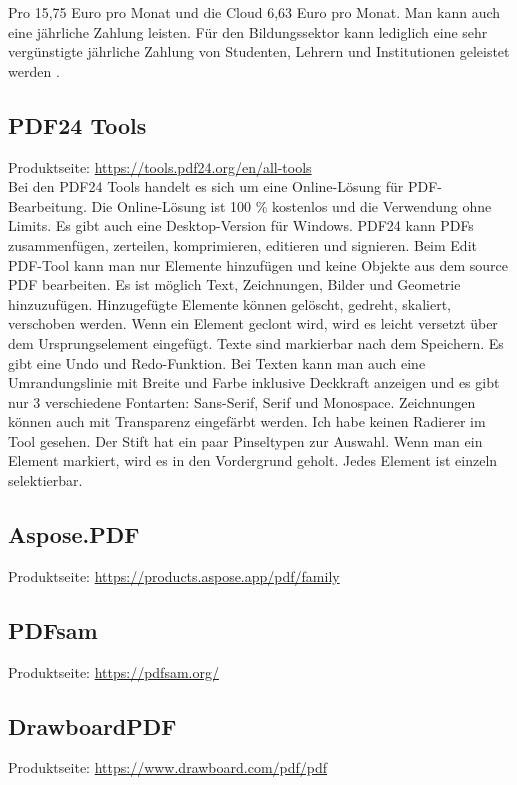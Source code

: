 Pro 15,75 Euro pro Monat und die Cloud 6,63 Euro pro Monat. Man kann auch eine jährliche Zahlung leisten. Für den Bildungssektor kann lediglich eine sehr vergünstigte jährliche Zahlung von Studenten, Lehrern und Institutionen geleistet werden \cite{foxit-editor}. 

\subsection{PDF24 Tools}
Produktseite: \url{https://tools.pdf24.org/en/all-tools} \\
Bei den PDF24 Tools handelt es sich um eine Online-Lösung für PDF-Bearbeitung. Die Online-Lösung ist 100 \% kostenlos und die Verwendung ohne Limits. Es gibt auch eine Desktop-Version für Windows. PDF24 kann PDFs zusammenfügen, zerteilen, komprimieren, editieren und signieren. Beim Edit PDF-Tool kann man nur Elemente hinzufügen und keine Objekte aus dem source PDF bearbeiten. Es ist möglich Text, Zeichnungen, Bilder und Geometrie hinzuzufügen. Hinzugefügte Elemente können gelöscht, gedreht, skaliert, verschoben werden. Wenn ein Element geclont wird, wird es leicht versetzt über dem Ursprungselement eingefügt. Texte sind markierbar nach dem Speichern. Es gibt eine Undo und Redo-Funktion. Bei Texten kann man auch eine Umrandungslinie mit Breite und Farbe inklusive Deckkraft anzeigen und es gibt nur 3 verschiedene Fontarten: Sans-Serif, Serif und Monospace. Zeichnungen können auch mit Transparenz eingefärbt werden. Ich habe keinen Radierer im Tool gesehen. Der Stift hat ein paar Pinseltypen zur Auswahl. Wenn man ein Element markiert, wird es in den Vordergrund geholt. Jedes Element ist einzeln selektierbar. 
\cite{pdf24}

\subsection{Aspose.PDF}
Produktseite: \url{https://products.aspose.app/pdf/family} \\


\subsection{PDFsam}
Produktseite: \url{https://pdfsam.org/}

\subsection{DrawboardPDF}
Produktseite: \url{https://www.drawboard.com/pdf/pdf}

